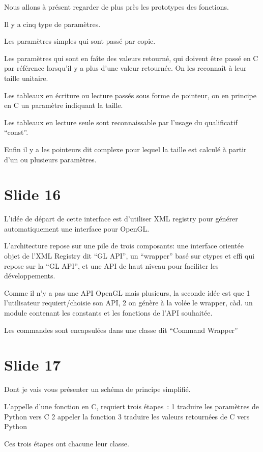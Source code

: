 \documentclass[12pt]{article}
\begin{document}
Nous allons à présent regarder de plus près les prototypes des fonctions.

Il y a cinq type de paramètres.

Les paramètres simples qui sont passé par copie.

Les paramètres qui sont en faîte des valeurs retourné, qui doivent être passé en C par référence
lorsqu'il y a plus d'une valeur retournée. On les reconnaît à leur taille unitaire.

Les tableaux en écriture ou lecture passés sous forme de pointeur, on en principe en C un paramètre
indiquant la taille.

Les tableaux en lecture seule sont reconnaissable par l'usage du qualificatif ``const''.

Enfin il y a les pointeurs dit complexe pour lequel la taille est calculé à partir d'un ou plusieurs paramètres.

\section{Slide 16}

L'idée de départ de cette interface est d'utiliser XML registry pour générer automatiquement une
interface pour OpenGL.

L'architecture repose sur une pile de trois composants:
  une interface orientée objet de l'XML Registry dit ``GL API'',
  un ``wrapper'' basé sur ctypes et cffi qui repose sur la ``GL API'',
  et une API de haut niveau pour faciliter les développements.

Comme il n'y a pas une API OpenGL mais plusieurs, la seconde idée est que
  1 l'utilisateur requiert/choisie son API,
  2 on génère à la volée le wrapper, càd. un module contenant les constants et les fonctions de l'API souhaitée.

Les commandes sont encapsulées dans une classe dit ``Command Wrapper'' 

\section{Slide 17}

Dont je vais vous présenter un schéma de principe simplifié.

L'appelle d'une fonction en C, requiert trois étapes~:
 1 traduire les paramètres de Python vers C
 2 appeler la fonction
 3 traduire les valeurs retournées de C vers Python

Ces trois étapes ont chacune leur classe.
\end{document}
